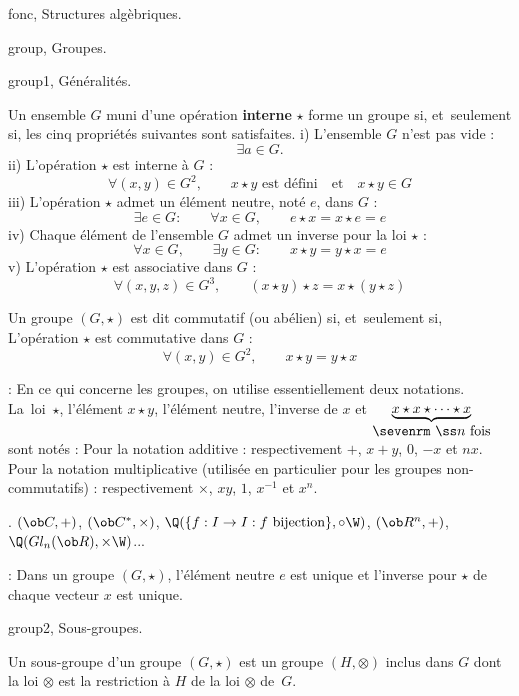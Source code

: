 

\Chapter fonc, Structures alg\`ebriques. 
\bigskip

\Section group, Groupes. 

\Subsection group1, G\'en\'eralit\'es. 


\Definition Un ensemble $G$ muni d'une op\'eration {\bf interne} $\star$ forme un groupe si, et~seulement si, 
les cinq propri\'et\'es suivantes sont satisfaites.
\pn
i) L'ensemble $G$ n'est pas vide : 
$$
\exists a\in G.
$$ 
\noindent ii) L'op\'eration $\star$ est interne \`a $G$ : 
$$
\forall (x,y)\in G^2, \qquad x\star y\mbox{ est d\'efini}\quad\mbox{et}\quad x\star y\in G
$$
\noindent iii) L'op\'eration $\star$ admet un \'el\'ement neutre, not\'e $e$, dans $G$ : 
$$
\exists e\in G:\qquad \forall x\in G,\qquad e\star x=x\star e=e
$$
\noindent iv) Chaque \'el\'ement de l'ensemble $G$ admet un inverse pour la loi $\star$ : 
$$
\forall x\in G, \qquad \exists y\in G:\qquad x\star y=y\star x=e
$$
\noindent v) L'op\'eration $\star$ est associative dans $G$ :
$$
\forall (x,y,z)\in G^3, \qquad(x\star y)\star z=x\star(y\star z)
$$

\bigskip

\Definition Un groupe $(G,\star)$ est dit commutatif (ou ab\'elien) si, et~seulement si, 
L'op\'eration $\star$ est commutative dans $G$ : 
$$
\forall (x,y)\in G^2, \qquad x\star y=y\star x
$$
\bigskip

\Remarque : En ce qui concerne les groupes, on utilise essentiellement deux notations. 
La~loi~$\star$, l'\'el\'ement $x\star y$, l'\'el\'ement neutre, l'inverse de $x$ et $\underbrace{x\star x\star \cdots\star x}_{\mbox{\sevenrm $\ss n$ fois}}$ sont not\'es : 
\medskip
\noindent
Pour la notation additive : respectivement $+$, $x+y$, $0$, $-x$ et $nx$.
\medskip
\noindent
Pour la notation multiplicative (utilis\'ee en particulier pour les groupes non-commutatifs) : respectivement $\times$, $xy$, $1$, $x^{-1}$ et $x^n$.
\bigskip

\Exemples.  $(\ob C,+)$, $(\ob C^*, \times)$, $\Q(\{f:I\to I: f\mbox{ bijection}\}, \circ\W)$, $(\ob R^n,+)$, $\Q(Gl_n(\ob R), \times\W)$... 
\bigskip


\Remarque : Dans un groupe $(G,\star)$, l'\'el\'ement neutre $e$ est unique et l'inverse pour $\star$ de chaque vecteur $x$ est unique. 
\bigskip

\Subsection group2, Sous-groupes.

\Definition [] Un sous-groupe d'un groupe $(G,\star)$ est un groupe $(H, \otimes)$ inclus dans $G$ dont la loi
$\otimes$ est la restriction \`a $H$ de la loi $\otimes$ de~$G$.  \bigskip

